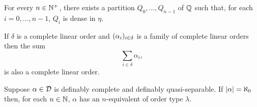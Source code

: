 	\begin{prp}\label{prp:qdense}
		For every $n\in\mathbb{N}^{+}$, there exists a partition $Q_0,\dotsc,Q_{n-1}$ of $\mathbb{Q}$ such that, for each $i=0,\dotsc,n-1$, $Q_i$ is dense in $\eta$.
	\end{prp}

	\begin{prp}\label{prp:csums}
		If $\delta$ is a complete linear order and $(\alpha_i)_{i\in\delta}$ is a family of complete linear orders then the sum
		\begin{equation}
			\sum_{i\in\delta}\alpha_i,
		\end{equation}
		is also a complete linear order.
	\end{prp}

	\begin{thm}
		Suppose $\alpha\in\mathcal{D}$ is definably complete and definably quasi-separable. If $\left\lvert\alpha\right\rvert=\aleph_0$ then, for each $n\in\mathbb{N}$, $\alpha$ has an $n$-equivalent of order type $\lambda$.
	\end{thm}
